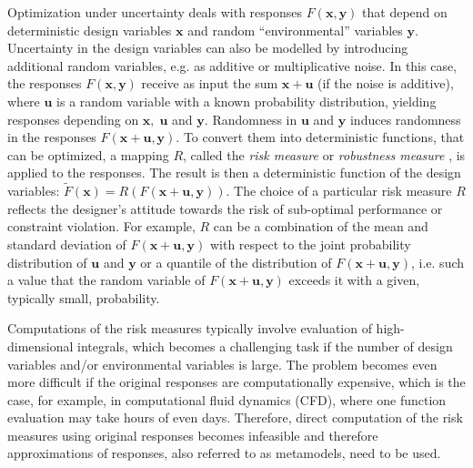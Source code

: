 \documentclass{llncs}
\begin{document}
Optimization under uncertainty deals with responses $F(\boldsymbol x,\boldsymbol y)$ that depend on deterministic design variables $\boldsymbol x$ and random ``environmental'' variables $\boldsymbol y$. Uncertainty in the design variables can also be modelled by introducing additional random variables, e.g. as additive or multiplicative noise. In this case, the responses $F(\boldsymbol x,\boldsymbol y)$ receive as input the sum $\boldsymbol x+\boldsymbol u$ (if the noise is additive), where $\boldsymbol u$ is a random variable with a known probability distribution, yielding responses depending on $\boldsymbol x,\; \boldsymbol u$ and $\boldsymbol y$. Randomness in $\boldsymbol u$ and $\boldsymbol y$ induces randomness in the responses $F(\boldsymbol x+\boldsymbol u,\boldsymbol y)$. To convert them into deterministic functions, that can be optimized, a mapping $R$, called the \textit{risk measure} \cite{RockafellarUryasev2000} or \textit{robustness measure} \cite{SchillingsSchulz2015}, is applied to the responses. The result is then a deterministic function of the design variables: $\widetilde{F}(\boldsymbol x)=R(F(\boldsymbol x+\boldsymbol u, \boldsymbol y))$. The choice of a particular risk measure $R$ reflects the designer's attitude towards the risk of sub-optimal performance or constraint violation. For example, $R$ can be a combination of the mean and standard deviation of $F(\boldsymbol x+ \boldsymbol u,\boldsymbol y)$ with respect to the joint probability distribution of $\boldsymbol u$ and $\boldsymbol y$ or a quantile of the distribution of $F(\boldsymbol x+ \boldsymbol u,\boldsymbol y)$, i.e. such a value that the random variable of $F(\boldsymbol x+\boldsymbol u,\boldsymbol y)$ exceeds it with a given, typically small, probability.

Computations of the risk measures typically involve evaluation of high-di\-mensional integrals, which becomes a challenging task if the number of design variables and/or environmental variables is large. The problem becomes even more difficult if the original responses are computationally expensive, which is the case, for example, in computational fluid dynamics (CFD), where one function evaluation may take hours of even days. Therefore, direct computation of the risk measures using original responses becomes infeasible and therefore approximations of responses, also referred to as metamodels, need to be used.
\end{document}
